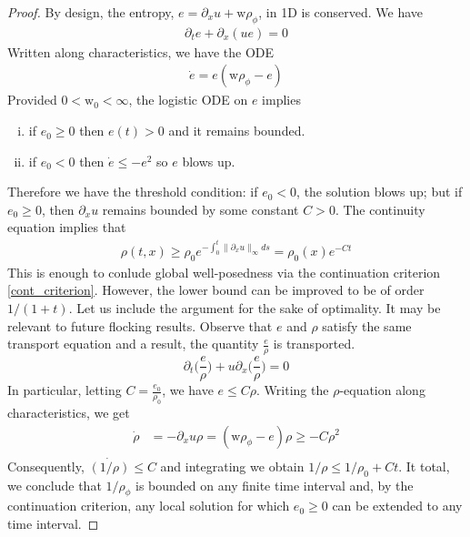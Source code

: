 \documentclass[11pt,letterpaper]{amsart}
\theoremstyle{plain}
\theoremstyle{definition}
\theoremstyle{remark}
\renewcommand{\geq}{\geqslant}
\renewcommand{\leq}{\leqslant}
\def \wt {\mathrm{w}}
\begin{document}
\begin{proof}
    By design, the entropy, $e = \partial_x u + \wt \rho_{\phi}$, in 1D is conserved. We have 
    \begin{align*}
        \partial_t e + \partial_x(u e) = 0 
    \end{align*}
    Written along characteristics, we have the ODE 
    \begin{align*}
        \dot{e} = e(\wt \rho_{\phi} -e)
    \end{align*}
    Provided $0 < \wt_0 < \infty$, the logistic ODE on $e$ implies 
    \begin{enumerate}[(i)]
        \item if $e_0 \geq 0$ then $e(t) > 0$ and it remains bounded. 
        \item if $e_0 < 0$ then $\dot{e} \leq -e^2$ so $e$ blows up. 
    \end{enumerate}
    Therefore we have the threshold condition: if $e_0 < 0$, the solution blows up; 
    but if $e_0 \geq 0$, then $\partial_x u$ remains bounded by some constant $C > 0$. 
    The continuity equation implies that 
    \begin{align*}
        \rho(t,x) \geq \rho_0 e^{-\int_0^t \|\partial_x u\|_{\infty} ds} = \rho_0(x) e^{-Ct}
    \end{align*}
    This is enough to conlude global well-posedness via the continuation criterion \eqref{cont_criterion}.  However, the lower bound 
    can be improved to be of order $1/(1+t)$. Let us include the argument for the sake of 
    optimality. It may be relevant to future flocking results. 
    Observe that $e$ and $\rho$ satisfy the same transport equation and a result, 
    the quantity $\frac{e}{\rho}$ is transported. 
    \begin{equation*} 
       \partial_t \big( \frac{e}{\rho} \big) + u \partial_x \big(\frac{e}{\rho} \big) = 0
    \end{equation*}
    In particular, letting $C = \frac{e_0}{\rho_0}$, we have $e \leq C \rho$. 
    Writing the $\rho$-equation along characteristics, we get 
    \begin{align*}
        \dot{\rho} &= -\partial_x u \rho = (\wt \rho_{\phi} - e) \rho \geq -C \rho^2 \\
    \end{align*}
    Consequently, $\dot{(1/\rho)} \leq C$ and integrating we obtain 
    $1/\rho \leq 1/\rho_0 + C t$.
    It total, we conclude that $1/\rho_{\phi}$ is bounded on any finite time interval 
    and, by the continuation criterion, any local solution for which $e_0 \geq 0$ can be extended to any time interval.
\end{proof}
\end{document}
